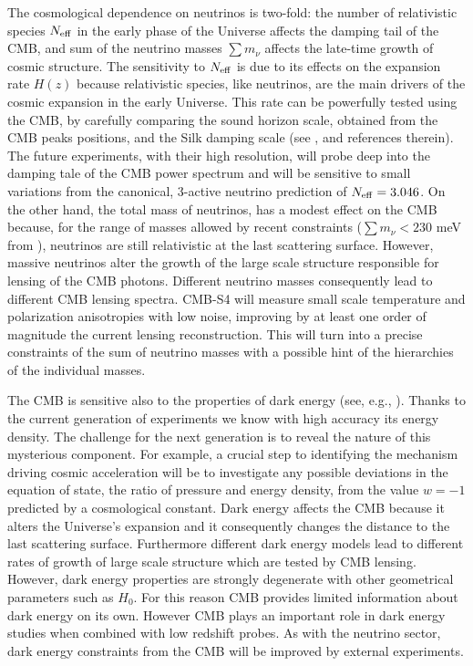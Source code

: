 \documentclass[aps,prd,reprint,superscriptaddress,nofootinbib,floatfix]{revtex4-1}
\begin{document}
The cosmological dependence on neutrinos is two-fold: the number of relativistic species $N_{\rm eff}$ in the early phase of the Universe affects the damping tail of the CMB, and sum of the neutrino masses $\sum m_\nu$ affects the late-time growth of cosmic structure.
The sensitivity to $N_{\rm eff}$ is due to its effects on the expansion rate $H(z)$ because relativistic species, like neutrinos, are the main drivers of the cosmic expansion in the early Universe. This rate can be powerfully tested using the CMB, by carefully comparing the sound horizon scale, obtained from the CMB peaks positions, and the Silk damping scale (see \cite{2013arXiv1309.5383A}, \cite{2013PhRvD..87h3008H} and references therein). 
The future experiments, with their high resolution, will probe deep into the damping tale of the CMB power spectrum and will be sensitive to small variations from the canonical, 3-active neutrino prediction of $N_{\rm eff}=3.046$. On the other hand, the total mass of neutrinos, has a modest effect on the CMB because, for the range of masses allowed by recent constraints ($\sum m_{\nu}<230$ meV from \cite{planck-collaboration:2014}), neutrinos are still relativistic at the last scattering surface. However, massive neutrinos alter the growth of the large scale structure responsible for lensing of the CMB photons. Different neutrino masses consequently lead to different CMB lensing spectra. CMB-S4 will measure small scale temperature and polarization anisotropies with low noise,  improving by at least one order of magnitude the current lensing reconstruction. This will turn into a precise constraints of the sum of neutrino masses with a possible hint of the hierarchies of the individual masses.

The CMB is sensitive also to the properties of dark energy (see, e.g., \cite{2010MNRAS.405.2639J}). Thanks to the current generation of experiments we know with high accuracy its energy density. The challenge for the next generation is to reveal the nature of this mysterious component. For example, a crucial step to identifying the mechanism driving cosmic acceleration will be to investigate any possible deviations in the equation of state, the ratio of pressure and energy density, from the value $w=-1$ predicted by a cosmological constant. 
Dark energy affects the CMB because it alters the Universe's expansion and it consequently changes the distance to the last scattering surface. Furthermore different dark energy models lead to different rates of growth of large scale structure which are tested by CMB lensing. 
However, dark energy properties are strongly degenerate with other geometrical parameters such as $H_{0}$. For this reason CMB provides limited information about dark energy on its own. However CMB plays an important role in dark energy studies when combined with low redshift probes. As with the neutrino sector, dark energy constraints from the CMB 
will be improved by external experiments.
\end{document}

